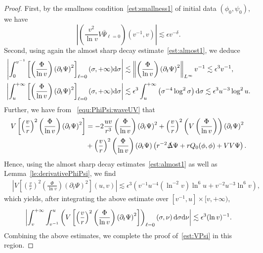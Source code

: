 \documentclass[a4paper,reqno]{amsart}
\theoremstyle{definition}
\numberwithin{equation}{section}
\def \d {{\rm{d}}}
\def \pt{\partial_{t}}
\def\Deltas{\slashed{\Delta}}
\def\ep{\epsilon}
\begin{document}
\begin{proof}
\smallskip
First, by the smallness condition~\eqref{est:smallness1} of initial data $(\phi_{0},\psi_{0})$, we have
\begin{equation*}
   \left| \left(\frac{v^{2}}{\ln v}V\bar{\Psi}_{\ell=0}\right)(v^{-1},v)\right|\lesssim \ep v^{-\delta}.
\end{equation*}
Second, using again the almost sharp decay estimate~\eqref{est:almost1}, we deduce
\begin{equation*}
\begin{aligned}
\left|\int_{0}^{v^{-1}}\left[\left(\frac{\Phi}{\ln v}\right)\left(\pt \Psi\right)^{2}\right]_{\ell=0}(\sigma,+\infty)\d \sigma   \right|
&\lesssim \left\|\left(\frac{\Phi}{\ln v}\right)\left(\pt \Psi\right)^{2}\right\|_{L^{\infty}}v^{-1}
\lesssim \ep^3 v^{-1},\\
\left|\int_{u}^{+\infty}\left[\left(\frac{\Phi}{\ln v}\right)\left(\pt \Psi\right)^{2}\right]_{\ell=0}(\sigma,+\infty)\d \sigma\right|
&\lesssim \ep^{3}\int_{u}^{+\infty}\left(\sigma^{-4}\log^{2}\sigma\right)\d \sigma\lesssim \ep^3 u^{-3}\log^{2}u.
\end{aligned}
\end{equation*}
Further, we have from ~\eqref{equ:PhiPsi:waveUV} that
\begin{equation*}
\begin{aligned}
V\left[\left(\frac{v}{r}\right)^{2}\left(\frac{\Phi}{\ln v}\right)\left(\pt \Psi\right)^{2}\right]
&=-2\frac{uv}{r^{3}}\left(\frac{\Phi}{\ln v}\right)\left(\pt \Psi\right)^{2}+\left(\frac{v}{r}\right)^{2}\left(V\left(\frac{\Phi}{\ln v}\right)\right)\left(\pt \Psi\right)^{2}\\
&+\left(\frac{v}{r}\right)^{2}\left(\frac{\Phi}{\ln v}\right)\left(\pt \Psi\right)
\left(r^{-2}\Deltas \Psi+rQ_{0}(\phi,\phi)+VV\Psi\right).
\end{aligned}
\end{equation*}
Hence, using the almost sharp decay estimates~\eqref{est:almost1} as well as 
Lemma~\ref{le:derivativePhiPsi}, we find
\begin{equation*}
\begin{aligned}
&\left|V\left[\left(\frac{v}{r}\right)^{2}\left(\frac{\Phi}{\ln v}\right)\left(\pt \Psi\right)^{2}\right](u,v)\right|\lesssim 
\ep^{3}\left(
v^{-1}u^{-4}(\ln^{-2}v)\ln^{6}u+v^{-2}u^{-3}\ln^{6}v
\right),
\end{aligned}
\end{equation*}
which yields, after integrating the above estimate over $[v^{-1},u]\times [v,+\infty)$, 
\begin{equation*}
\left|\int_{v}^{+\infty}\int_{v^{-1}}^{u}\left(V\left[\left(\frac{v}{r}\right)^{2}\left(\frac{\Phi}{\ln v}\right)\left(\pt \Psi\right)^{2}\right]\right)_{\ell=0}\left(\sigma,\nu\right)\d \sigma \d \nu\right|\lesssim \ep^3 (\ln v)^{-1}.
\end{equation*}
Combining the above estimates, we complete the proof of~\eqref{est:VPsi} in this region.
\end{proof}
\end{document}
